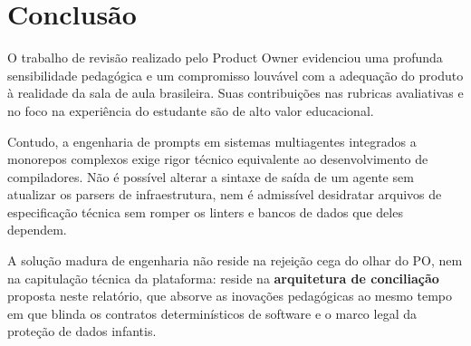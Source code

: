 \documentclass[11pt,a4paper]{article}
\begin{document}
\section{Conclusão}

O trabalho de revisão realizado pelo Product Owner evidenciou uma profunda sensibilidade pedagógica e um compromisso louvável com a adequação do produto à realidade da sala de aula brasileira. Suas contribuições nas rubricas avaliativas e no foco na experiência do estudante são de alto valor educacional.

Contudo, a engenharia de prompts em sistemas multiagentes integrados a monorepos complexos exige rigor técnico equivalente ao desenvolvimento de compiladores. Não é possível alterar a sintaxe de saída de um agente sem atualizar os parsers de infraestrutura, nem é admissível desidratar arquivos de especificação técnica sem romper os linters e bancos de dados que deles dependem.

A solução madura de engenharia não reside na rejeição cega do olhar do PO, nem na capitulação técnica da plataforma: reside na \textbf{arquitetura de conciliação} proposta neste relatório, que absorve as inovações pedagógicas ao mesmo tempo em que blinda os contratos determinísticos de software e o marco legal da proteção de dados infantis.

\newpage


\end{document}

